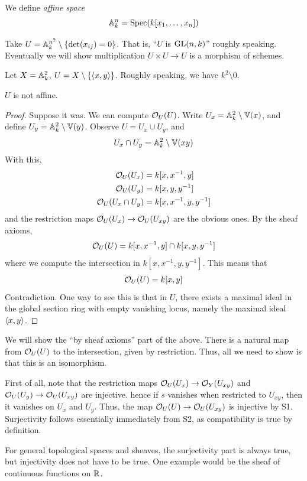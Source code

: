 \documentclass{article}
\begin{document}
We define \emph{affine space}
\[\mathbb{A}_{k}^{n} = \operatorname{Spec}(k[x_1, \dots, x_n])\]

\begin{example}
    Take \(U = \mathbb{A}_{k}^{n^2} \setminus \{\det(x_{ij}) = 0\}\). That is, ``\(U\) is \(\operatorname{GL}(n, k)\)'' roughly speaking. Eventually we will show multiplication \(U \times U \to U\) is a morphism of schemes.
\end{example}

\begin{example}
    Let \(X = \mathbb{A}_{k}^{2}\), \(U = X \setminus \{\left\langle x, y \right\rangle\}\). Roughly speaking, we have \(k^2 \setminus 0\).

    \begin{claim}
        \(U\) is not affine.
    \end{claim}
    \begin{proof}
        Suppose it was. We can compute \(\mathcal{O}_U(U)\). Write \(U_x = \mathbb{A}_{k}^{2} \setminus \mathbb{V}(x)\), and define \(U_y = \mathbb{A}_{k}^{2} \setminus \mathbb{V}(y)\). Observe \(U = U_x \cup U_y\), and
        \[U_x \cap U_y = \mathbb{A}_{k}^{2} \setminus \mathbb{V}(xy)\]
        With this,
        \begin{align*}
            \mathcal{O}_U(U_x) &= k[x, x^{-1}, y] \\
            \mathcal{O}_U(U_y) &= k[x, y, y^{-1}] \\
            \mathcal{O}_U(U_x \cap U_y) &= k[x,x^{-1},y,y^{-1}]
        \end{align*}
        and the restriction maps \(\mathcal{O}_U(U_x) \to \mathcal{O}_U(U_{xy})\) are the obvious ones. By the sheaf axioms,
        \[\mathcal{O}_U(U) = k[x, x^{-1}, y] \cap k[x, y, y^{-1}]\]
        where we compute the intersection in \(k[x, x^{-1}, y, y^{-1}]\). This means that
        \[\mathcal{O}_U(U) = k[x, y]\]
        Contradiction. One way to see this is that in \(U\), there exists a maximal ideal in the global section ring with empty vanishing locus, namely the maximal ideal \(\left\langle x, y \right\rangle\).
    \end{proof}
\end{example}

\begin{addendum}
    We will show the ``by sheaf axioms'' part of the above. There is a natural map from \(\mathcal{O}_U(U)\) to the intersection, given by restriction. Thus, all we need to show is that this is an isomorphism.
    
    First of all, note that the restriction maps \(\mathcal{O}_U(U_x) \to \mathcal{O}_Y(U_{xy})\) and \(\mathcal{O}_U(U_y) \to \mathcal{O}_U(U_{xy})\) are injective. hence if \(s\) vanishes when restricted to \(U_{xy}\), then it vanishes on \(U_x\) and \(U_y\). Thus, the map \(\mathcal{O}_U(U) \to \mathcal{O}_U(U_{xy})\) is injective by S1. Surjectivity follows essentially immediately from S2, as compatibility is true by definition.

    For general topological spaces and sheaves, the surjectivity part is always true, but injectivity does not have to be true. One example would be the sheaf of continuous functions on \(\mathbb{R}\).
\end{addendum}
\end{document}
